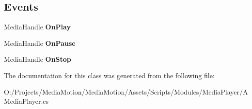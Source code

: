 \subsection*{Events}
\begin{DoxyCompactItemize}
\item 
\hypertarget{class_media_motion_1_1_modules_1_1_media_player_1_1_a_media_player_aaebbdcf185860af282d28b9b794715a8}{Media\+Handle {\bfseries On\+Play}}\label{class_media_motion_1_1_modules_1_1_media_player_1_1_a_media_player_aaebbdcf185860af282d28b9b794715a8}

\item 
\hypertarget{class_media_motion_1_1_modules_1_1_media_player_1_1_a_media_player_ada53a81f988f6417fbc164f2d127c7c0}{Media\+Handle {\bfseries On\+Pause}}\label{class_media_motion_1_1_modules_1_1_media_player_1_1_a_media_player_ada53a81f988f6417fbc164f2d127c7c0}

\item 
\hypertarget{class_media_motion_1_1_modules_1_1_media_player_1_1_a_media_player_a736b75fe807f3e553281ae7f9a1bf44d}{Media\+Handle {\bfseries On\+Stop}}\label{class_media_motion_1_1_modules_1_1_media_player_1_1_a_media_player_a736b75fe807f3e553281ae7f9a1bf44d}

\end{DoxyCompactItemize}


The documentation for this class was generated from the following file\+:\begin{DoxyCompactItemize}
\item 
O\+:/\+Projects/\+Media\+Motion/\+Media\+Motion/\+Assets/\+Scripts/\+Modules/\+Media\+Player/A\+Media\+Player.\+cs\end{DoxyCompactItemize}
